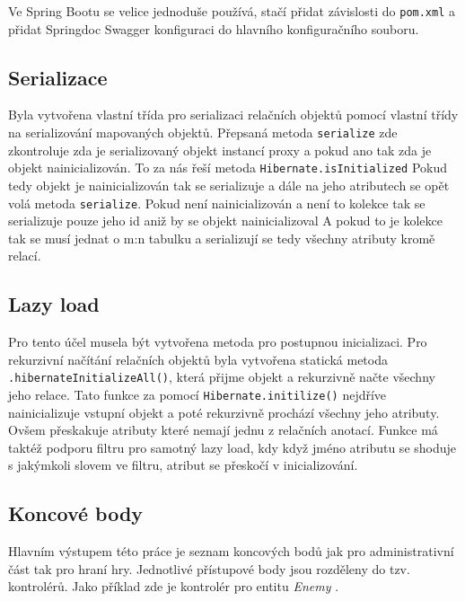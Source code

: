 Ve Spring Bootu se velice jednoduše používá, stačí přidat závislosti do \texttt{pom.xml} a přidat Springdoc Swagger konfiguraci do hlavního konfiguračního souboru.

\subsection{Serializace}\label{sec:impl:serialization}
Byla vytvořena vlastní třída pro serializaci relačních objektů pomocí vlastní třídy 
na serializování mapovaných objektů. Přepsaná metoda \texttt{serialize} zde zkontroluje zda je serializovaný objekt instancí proxy a pokud ano tak zda je objekt nainicializován. To za nás řeší metoda \texttt{Hibernate.isInitialized} 
Pokud tedy objekt je nainicializován tak se serializuje a dále na jeho atributech se opět volá metoda \texttt{serialize}. Pokud není nainicializován a není to kolekce tak se serializuje pouze jeho id aniž by se objekt nainicializoval 
A pokud to je kolekce tak se musí jednat o m:n tabulku a serializují se tedy všechny atributy kromě relací. 


\subsection{Lazy load}\label{sec:impl:lazyload}
Pro tento účel musela být vytvořena metoda pro postupnou inicializaci. Pro rekurzivní načítání relačních objektů byla vytvořena statická metoda \texttt{.hibernateInitializeAll()}, která přijme objekt a rekurzivně načte všechny jeho relace. 
Tato funkce za pomocí \texttt{Hibernate.initilize()} nejdříve nainicializuje vstupní objekt a poté rekurzivně prochází všechny jeho atributy. Ovšem přeskakuje atributy které nemají jednu z relačních anotací. Funkce má taktéž podporu filtru pro samotný lazy load, kdy když jméno atributu se shoduje s jakýmkoli slovem ve filtru, atribut se přeskočí v inicializování.


\subsection{Koncové body}\label{sec:impl:endpoints}
Hlavním výstupem této práce je seznam koncových bodů jak pro administrativní část tak pro hraní hry. Jednotlivé přístupové body jsou rozděleny do tzv. kontrolérů. Jako příklad zde je kontrolér pro entitu \textit{Enemy} . 

